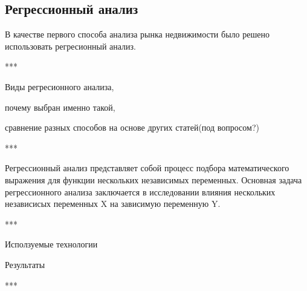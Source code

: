 
\subsection{Регрессионный анализ}
\label{sec:experiment:regression}


В качестве первого способа анализа рынка недвижимости было решено использовать регресионный анализ.

***

Виды регресионного анализа, 

почему выбран именно такой, 

сравнение разных способов на основе других статей(под вопросом?)

***

Регрессионный анализ представляет собой процесс подбора математического выражения для функции нескольких независимых
переменных. Основная задача регрессионного анализа заключается в исследовании влияния нескольких независисых переменных
X на зависимую переменную Y.

***

Исползуемые технологии

Результаты

***


